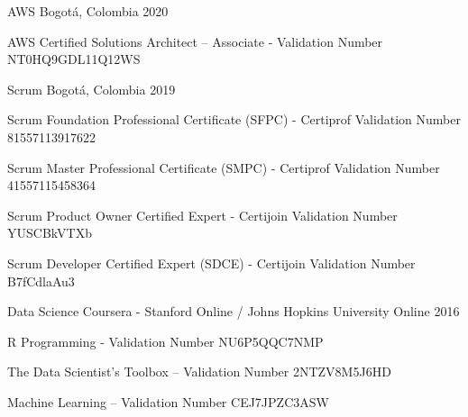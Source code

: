 \begin{cventries}

    \cventry
	{}
	{AWS}
	{Bogotá, Colombia}
	{2020}
	{
		\begin{cvitems}
			\item {AWS Certified Solutions Architect – Associate - Validation Number NT0HQ9GDL11Q12WS}
		\end{cvitems}
	}
	
    \cventry
	{}
	{Scrum}
	{Bogotá, Colombia}
	{2019}
	{
		\begin{cvitems}
			\item {Scrum Foundation Professional Certificate (SFPC) - Certiprof Validation Number 81557113917622}
			\item {Scrum Master Professional Certificate (SMPC) - Certiprof Validation Number 41557115458364}
			\item {Scrum Product Owner Certified Expert - Certijoin Validation Number YUSCBkVTXb}
			\item {Scrum Developer Certified Expert (SDCE) - Certijoin Validation Number B7fCdlaAu3}
		\end{cvitems}
	}
	
	\cventry
	{}
	{Data Science}
	{Coursera - Stanford Online / Johns Hopkins University Online}
	{2016}
	{
		\begin{cvitems}
			\item {R Programming
			- Validation Number NU6P5QQC7NMP}
			\item {The Data Scientist’s Toolbox
			– Validation Number 2NTZV8M5J6HD}
			\item {Machine Learning
			– Validation Number CEJ7JPZC3ASW}
		\end{cvitems}
	}
    
\end{cventries}